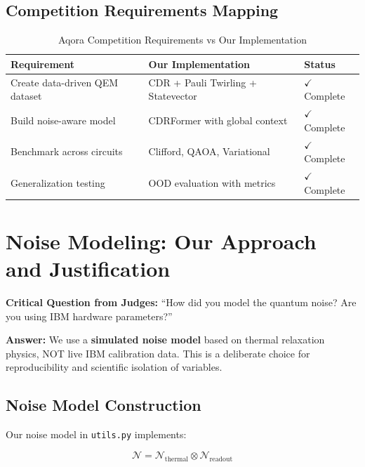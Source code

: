 \documentclass[11pt, a4paper]{article}
\begin{document}
\subsection{Competition Requirements Mapping}

\begin{table}[H]
\centering
\caption{Aqora Competition Requirements vs Our Implementation}
\begin{tabular}{@{}p{5cm}p{5cm}p{3cm}@{}}
\toprule
\textbf{Requirement} & \textbf{Our Implementation} & \textbf{Status} \\ \midrule
Create data-driven QEM dataset & CDR + Pauli Twirling + Statevector & $\checkmark$ Complete \\
Build noise-aware model & CDRFormer with global context & $\checkmark$ Complete \\
Benchmark across circuits & Clifford, QAOA, Variational & $\checkmark$ Complete \\
Generalization testing & OOD evaluation with metrics & $\checkmark$ Complete \\
\bottomrule
\end{tabular}
\end{table}

\section{Noise Modeling: Our Approach and Justification}

\begin{keyinsight}
\textbf{Critical Question from Judges:} ``How did you model the quantum noise? Are you using IBM hardware parameters?''

\textbf{Answer:} We use a \textbf{simulated noise model} based on thermal relaxation physics, NOT live IBM calibration data. This is a deliberate choice for reproducibility and scientific isolation of variables.
\end{keyinsight}

\subsection{Noise Model Construction}

Our noise model in \texttt{utils.py} implements:

\begin{equation}
\mathcal{N} = \mathcal{N}_{\text{thermal}} \otimes \mathcal{N}_{\text{readout}}
\end{equation}
\end{document}
